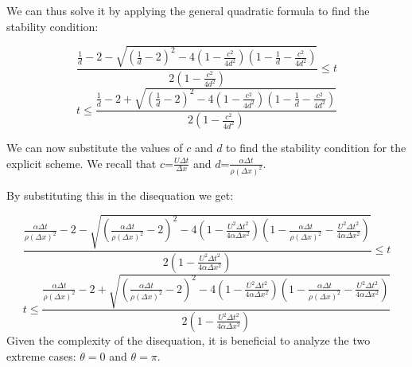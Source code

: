 \documentclass{article}
\begin{document}
We can thus solve it by applying the general quadratic formula to find the stability condition:

\begin{equation}
\frac{\frac{1}{d}-2-\sqrt{(\frac{1}{d}-2)^2-4(1-\frac{c^2}{4d^2})(1-\frac{1}{d}-\frac{c^2}{4d^2})}}{2(1-\frac{c^2}{4d^2})}\leq t
\end{equation}
\begin{equation}
t \leq \frac{\frac{1}{d}-2+\sqrt{(\frac{1}{d}-2)^2-4(1-\frac{c^2}{4d^2})(1-\frac{1}{d}-\frac{c^2}{4d^2})}}{2(1-\frac{c^2}{4d^2})}
\end{equation}

We can now substitute the values of \(c\) and \(d\) to find the stability condition for the explicit scheme.
We recall that \(c\)=\(\frac{U \Delta t}{\Delta x}\) and \(d\)=\(\frac{\alpha \Delta t}{\rho (\Delta x)^2}\).

By substituting this in the disequation we get:

\begin{equation}
\frac{\frac{\alpha \Delta t}{\rho (\Delta x)^2}-2-\sqrt{(\frac{\alpha \Delta t}{\rho (\Delta x)^2}-2)^2-4(1-\frac{U^2 \Delta t^2}{4 \alpha \Delta x^2})(1-\frac{\alpha \Delta t}{\rho (\Delta x)^2}-\frac{U^2 \Delta t^2}{4 \alpha \Delta x^2})}}{2(1-\frac{U^2 \Delta t^2}{4 \alpha \Delta x^2})}\leq t
\end{equation}
\begin{equation}
  t \leq \frac{\frac{\alpha \Delta t}{\rho (\Delta x)^2}-2+\sqrt{(\frac{\alpha \Delta t}{\rho (\Delta x)^2}-2)^2-4(1-\frac{U^2 \Delta t^2}{4 \alpha \Delta x^2})(1-\frac{\alpha \Delta t}{\rho (\Delta x)^2}-\frac{U^2 \Delta t^2}{4 \alpha \Delta x^2})}}{2(1-\frac{U^2 \Delta t^2}{4 \alpha \Delta x^2})}
\end{equation}
Given the complexity of the disequation, it is beneficial to analyze the two extreme cases: \(\theta = 0\) and \(\theta = \pi\).
\end{document}
